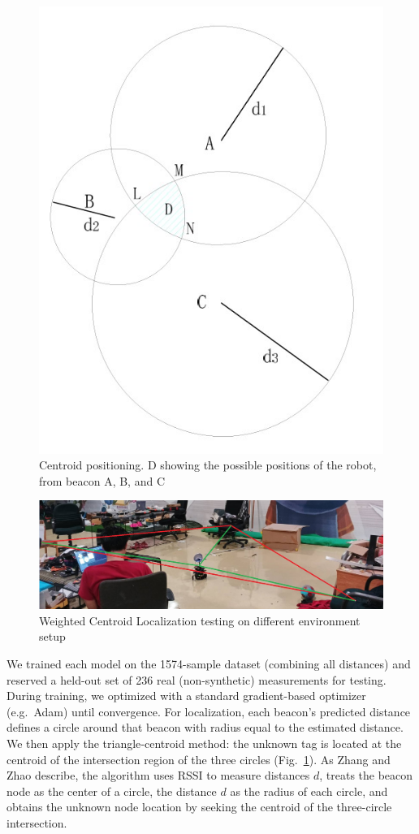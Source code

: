 \begin{figure}[!b]
  \centering
  \includegraphics[width=0.5\linewidth]{img/fig2.jpg}
  \caption{Centroid positioning. D showing the possible positions of the robot, from beacon A, B, and C \cite{WSNCentroid}}
  \label{fig:centroid}
\end{figure}

\begin{figure}[!b]
  \centering
  \includegraphics[width=0.75\linewidth]{img/rssi.jpg}
  \caption{Weighted Centroid Localization testing on different environment setup}
  \label{fig:environment}
\end{figure}

We trained each model on the 1574-sample dataset (combining all distances) and reserved a held-out set of 236 real (non-synthetic) measurements for testing. During training, we optimized with a standard gradient-based optimizer (e.g.\ Adam) until convergence. For localization, each beacon’s predicted distance defines a circle around that beacon with radius equal to the estimated distance. We then apply the triangle‐centroid method: the unknown tag is located at the centroid of the intersection region of the three circles (Fig.~\ref{fig:centroid}). As Zhang and Zhao \cite{WSNCentroid} describe, the algorithm uses RSSI to measure distances $d$, treats the beacon node as the center of a circle, the distance $d$ as the radius of each circle, and obtains the unknown node location by seeking the centroid of the three-circle intersection. 

